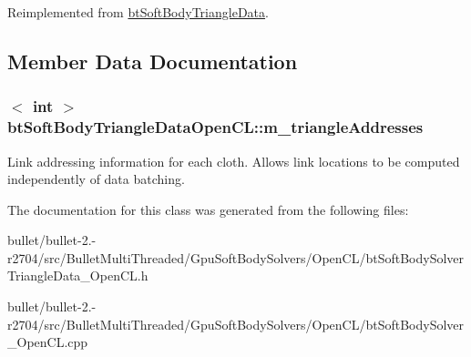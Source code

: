 Reimplemented from \hyperlink{classbt_soft_body_triangle_data}{bt\+Soft\+Body\+Triangle\+Data}.



\subsection{Member Data Documentation}
\hypertarget{classbt_soft_body_triangle_data_open_c_l_a7b0d241380b3cbfbd7c386b354a268fd}{
\subsubsection[{m\+\_\+triangle\+Addresses}]{$<$ int $>$ bt\+Soft\+Body\+Triangle\+Data\+Open\+C\+L\+::m\+\_\+triangle\+Addresses}}\label{classbt_soft_body_triangle_data_open_c_l_a7b0d241380b3cbfbd7c386b354a268fd}
Link addressing information for each cloth. Allows link locations to be computed independently of data batching. 

The documentation for this class was generated from the following files\+:\begin{DoxyCompactItemize}
\item 
bullet/bullet-\/2.-\/r2704/src/\+Bullet\+Multi\+Threaded/\+Gpu\+Soft\+Body\+Solvers/\+Open\+C\+L/bt\+Soft\+Body\+Solver\+Triangle\+Data\+\_\+\+Open\+C\+L.\+h\item 
bullet/bullet-\/2.-\/r2704/src/\+Bullet\+Multi\+Threaded/\+Gpu\+Soft\+Body\+Solvers/\+Open\+C\+L/bt\+Soft\+Body\+Solver\+\_\+\+Open\+C\+L.\+cpp\end{DoxyCompactItemize}
